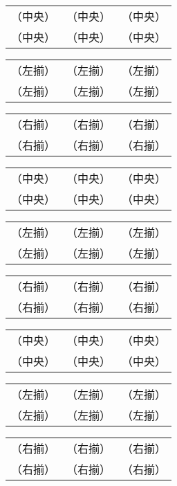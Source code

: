 \documentclass[twocolumn]{jarticle}
\begin{document}
\begin{tabular}{|c|c|c|}
（中央）&（中央）&（中央）\\
（中央）&（中央）&（中央）
\end{tabular}

\begin{tabular}{|l|l|l|}
（左揃）&（左揃）&（左揃）\\
（左揃）&（左揃）&（左揃）
\end{tabular}

\begin{tabular}{|r|r|r|}
（右揃）&（右揃）&（右揃）\\
（右揃）&（右揃）&（右揃）
\end{tabular}

\begin{tabular}{|c|c|c|}
（中央） & （中央） & （中央） \\
（中央） & （中央） & （中央）
\end{tabular}

\begin{tabular}{|l|l|l|}
（左揃） & （左揃） & （左揃） \\
（左揃） & （左揃） & （左揃）
\end{tabular}

\begin{tabular}{|r|r|r|}
（右揃） & （右揃） & （右揃） \\
（右揃） & （右揃） & （右揃）
\end{tabular}


\begin{tabular}{|c|c|c|}
\mbox{（中央）}&\mbox{（中央）}&\mbox{（中央）}\\
\mbox{（中央）}&\mbox{（中央）}&\mbox{（中央）}
\end{tabular}

\begin{tabular}{|l|l|l|}
\mbox{（左揃）}&\mbox{（左揃）}&\mbox{（左揃）}\\
\mbox{（左揃）}&\mbox{（左揃）}&\mbox{（左揃）}
\end{tabular}

\begin{tabular}{|r|r|r|}
\mbox{（右揃）}&\mbox{（右揃）}&\mbox{（右揃）}\\
\mbox{（右揃）}&\mbox{（右揃）}&\mbox{（右揃）}
\end{tabular}
\end{document}

